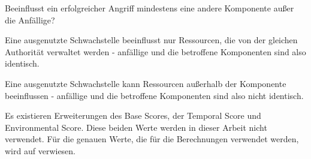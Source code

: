     \begin{description}[itemsep=0.7em,align=left,labelindent=0pt,leftmargin=0pt]
        \item [Scope:] Beeinflusst ein erfolgreicher Angriff mindestens eine andere Komponente außer die Anfällige?
            \begin{description}[noitemsep,align=left,labelindent=0.7cm,leftmargin=0.7cm]
                \item [Unchanged:] Eine ausgenutzte Schwachstelle beeinflusst nur Ressourcen, die von der gleichen Authorität verwaltet werden - anfällige und die betroffene Komponenten sind also identisch.
                \item [Changed:] Eine ausgenutzte Schwachstelle kann Ressourcen außerhalb der Komponente beeinflussen - anfällige und die betroffene Komponenten sind also nicht identisch.
            \end{description}
    \end{description}
    
    \noindent Es existieren Erweiterungen des Base Scores, der Temporal Score und Environmental Score. 
    Diese beiden Werte werden in dieser Arbeit nicht verwendet. 
    Für die genauen Werte, die für die Berechnungen verwendet werden, wird auf \cite{CVSSspec} verwiesen.
    